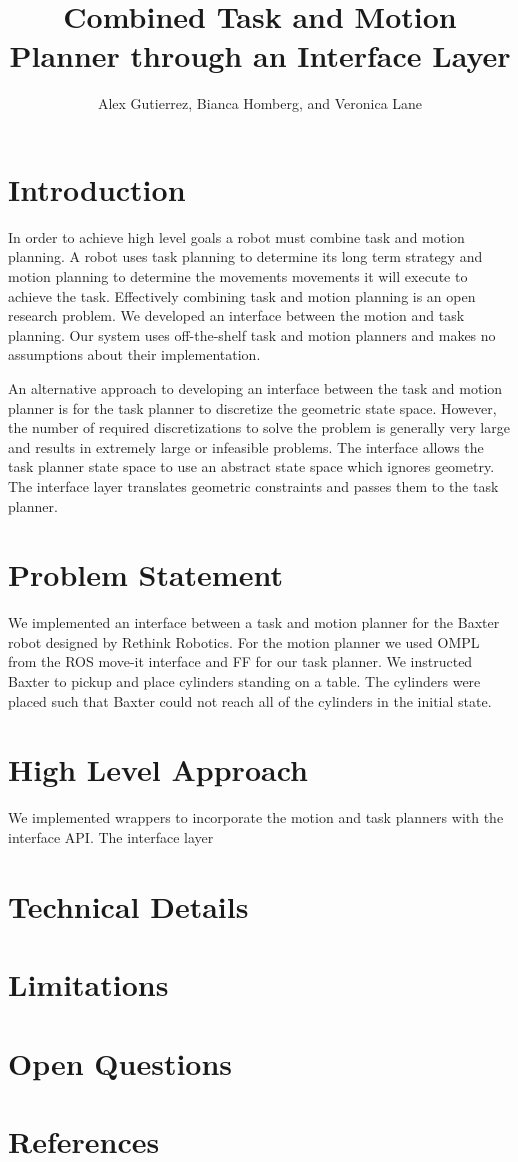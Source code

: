 \documentclass[12pt]{article}
\title{Combined Task and Motion Planner through an Interface Layer}
\author{Alex Gutierrez, Bianca Homberg, and Veronica Lane}
\begin{document}
\maketitle

\section{Introduction}

In order to achieve high level goals a robot must combine task and motion planning. A robot uses task planning to determine its long term strategy and motion planning to determine the movements movements it  will execute to achieve the task. Effectively combining task and motion planning is an open research problem. We developed an interface between the motion and task planning. Our system uses off-the-shelf task and motion planners and makes no assumptions about their implementation.
 
An alternative approach to developing an interface between the task and motion planner is for the task planner to discretize the geometric state space. However, the number of required discretizations to solve the problem is generally very large and results in extremely large or infeasible problems. The interface allows the task planner state space to use an abstract state space which ignores geometry. The interface layer translates geometric constraints and passes them to the task planner.

\section{Problem Statement}

We implemented an interface between a task and motion planner for the Baxter robot designed by Rethink Robotics. For the motion planner we used OMPL from the ROS move-it interface and FF for our task planner. We instructed Baxter to pickup and place cylinders standing on a table. The cylinders were placed such that Baxter could not reach all of the cylinders in the initial state. 

\section{High Level Approach}
We implemented wrappers to incorporate the motion and task planners with the interface API. The interface layer 

\section{Technical Details}

\section{Limitations}

\section{Open Questions}

\section{References}
\end{document}
